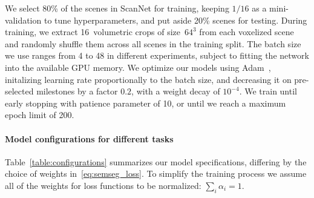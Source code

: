 



We select 80\% of the scenes in ScanNet for training, keeping $1/16$ as a mini-validation to tune hyperparameters, and put aside 20\% scenes for testing.
During training, we extract 16~volumetric crops of size~$64^3$ from each voxelized scene and randomly shuffle them across all scenes in the training split.
The batch size we use ranges from 4 to 48 in different experiments, subject to fitting the network into the available GPU memory.
We optimize our models using Adam~\cite{kingma2014adam}, initalizing learning rate proportionally to the batch size, and decreasing it on pre-selected milestones by a factor $0.2$, with a weight decay of $10^{-4}$.
We train until early stopping with patience parameter of 10, or until we reach a maximum epoch limit of 200.



\paragraph{Model configurations for different tasks}
\label{results:model_configs}
Table~\ref{table:configurations} summarizes our model specifications, differing by the choice of weights in~\eqref{eq:semseg_loss}.
To simplify the training process we assume all of the weights for loss functions to be normalized: $\sum_i \alpha_i = 1$.
